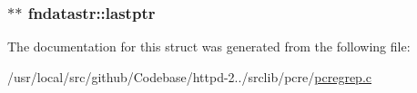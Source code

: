\subsubsection[{\texorpdfstring{lastptr}{lastptr}}]{$\ast$$\ast$ fndatastr\+::lastptr}\hypertarget{structfndatastr_afe11c7a51bae05edde3756d1f569fec5}{}\label{structfndatastr_afe11c7a51bae05edde3756d1f569fec5}


The documentation for this struct was generated from the following file\+:\begin{DoxyCompactItemize}
\item 
/usr/local/src/github/\+Codebase/httpd-\/2../srclib/pcre/\hyperlink{pcregrep_8c}{pcregrep.\+c}\end{DoxyCompactItemize}
